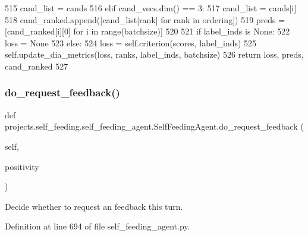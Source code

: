 \begin{DoxyCode}
515                     cand\_list = cands
516                 \textcolor{keywordflow}{elif} cand\_vecs.dim() == 3:
517                     cand\_list = cands[i]
518                 cand\_ranked.append([cand\_list[rank] \textcolor{keywordflow}{for} rank \textcolor{keywordflow}{in} ordering])
519             preds = [cand\_ranked[i][0] \textcolor{keywordflow}{for} i \textcolor{keywordflow}{in} range(batchsize)]
520 
521         \textcolor{keywordflow}{if} label\_inds \textcolor{keywordflow}{is} \textcolor{keywordtype}{None}:
522             loss = \textcolor{keywordtype}{None}
523         \textcolor{keywordflow}{else}:
524             loss = self.criterion(scores, label\_inds)
525             self.update\_dia\_metrics(loss, ranks, label\_inds, batchsize)
526         \textcolor{keywordflow}{return} loss, preds, cand\_ranked
527 
\end{DoxyCode}
\mbox{\label{classprojects_1_1self__feeding_1_1self__feeding__agent_1_1SelfFeedingAgent_a8d1ee3e56b88c0efaed910cc867970d3}} 
\subsubsection{\texorpdfstring{do\+\_\+request\+\_\+feedback()}{do\_request\_feedback()}}
{\footnotesize\ttfamily def projects.\+self\+\_\+feeding.\+self\+\_\+feeding\+\_\+agent.\+Self\+Feeding\+Agent.\+do\+\_\+request\+\_\+feedback (\begin{DoxyParamCaption}\item[{}]{self,  }\item[{}]{positivity }\end{DoxyParamCaption})}

\begin{DoxyVerb}Decide whether to request an feedback this turn.
\end{DoxyVerb}
 

Definition at line 694 of file self\+\_\+feeding\+\_\+agent.\+py.


